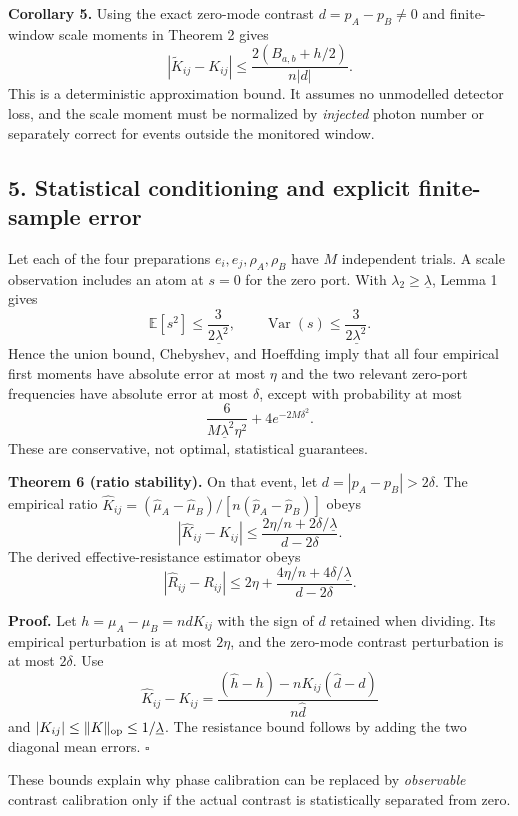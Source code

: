 \documentclass[
  10pt,
  a4paper,
]{article}
\begin{document}
\textbf{Corollary 5.} Using the exact zero-mode contrast \(d=p_A-p_B\ne0\) and finite-window scale moments in Theorem 2 gives \[
|\widetilde K_{ij}-K_{ij}|\leq \frac{2(B_{a,b}+h/2)}{n|d|}.
\] This is a deterministic approximation bound. It assumes no unmodelled detector loss, and the scale moment must be normalized by \emph{injected} photon number or separately correct for events outside the monitored window.

\subsection{5. Statistical conditioning and explicit finite-sample error}\label{statistical-conditioning-and-explicit-finite-sample-error}

Let each of the four preparations \(e_i,e_j,\rho_A,\rho_B\) have \(M\) independent trials. A scale observation includes an atom at \(s=0\) for the zero port. With \(\lambda_2\geq\underline\lambda\), Lemma 1 gives \[
\mathbb E[s^2]\leq\frac3{2\underline\lambda^2},\qquad
\operatorname{Var}(s)\leq\frac3{2\underline\lambda^2}.
\] Hence the union bound, Chebyshev, and Hoeffding imply that all four empirical first moments have absolute error at most \(\eta\) and the two relevant zero-port frequencies have absolute error at most \(\delta\), except with probability at most \[
\boxed{\frac{6}{M\underline\lambda^2\eta^2}+4e^{-2M\delta^2}.}
\] These are conservative, not optimal, statistical guarantees.

\textbf{Theorem 6 (ratio stability).} On that event, let \(d=|p_A-p_B|>2\delta\). The empirical ratio \(\widehat K_{ij}=(\widehat\mu_A-\widehat\mu_B)/[n(\widehat p_A-\widehat p_B)]\) obeys \[
\boxed{|\widehat K_{ij}-K_{ij}|\leq
\frac{2\eta/n+2\delta/\underline\lambda}{d-2\delta}.}
\] The derived effective-resistance estimator obeys \[
\boxed{|\widehat R_{ij}-R_{ij}|\leq2\eta+
\frac{4\eta/n+4\delta/\underline\lambda}{d-2\delta}.}
\]

\textbf{Proof.} Let \(h=\mu_A-\mu_B=ndK_{ij}\) with the sign of \(d\) retained when dividing. Its empirical perturbation is at most \(2\eta\), and the zero-mode contrast perturbation is at most \(2\delta\). Use \[
\widehat K_{ij}-K_{ij}=\frac{(\widehat h-h)-nK_{ij}(\widehat d-d)}{n\widehat d}
\] and \(|K_{ij}|\leq\|K\|_{\rm op}\leq1/\underline\lambda\). The resistance bound follows by adding the two diagonal mean errors. \(\square\)

These bounds explain why phase calibration can be replaced by \emph{observable} contrast calibration only if the actual contrast is statistically separated from zero.
\end{document}
